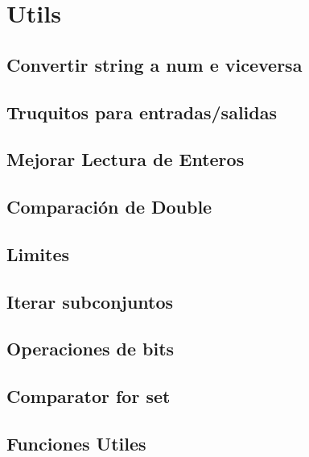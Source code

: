 \newpage
\section{Utils}
\subsection{Convertir string a num e viceversa}

\subsection{Truquitos para entradas/salidas}

\subsection{Mejorar Lectura de Enteros}

\subsection{Comparaci\'on de Double}

\subsection{Limites}

\subsection{Iterar subconjuntos}

\subsection{Operaciones de bits}

\subsection{Comparator for set}

%
\subsection{Funciones Utiles}

